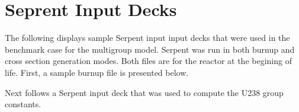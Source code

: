 \chapter{Seprent Input Decks}
\label{appendix_serpent_input}

The following displays sample Serpent input input decks that were used in the benchmark 
case for the multigroup model.  Serpent was run in both burnup and cross section generation 
modes.  Both files are for the reactor at the begining of life.  First, a sample burnup file 
is presented below.  

\vspace{1em}



\vspace{1em}

Next follows a Serpent input deck that was used to compute the U238 group constants.

\vspace{1em}



